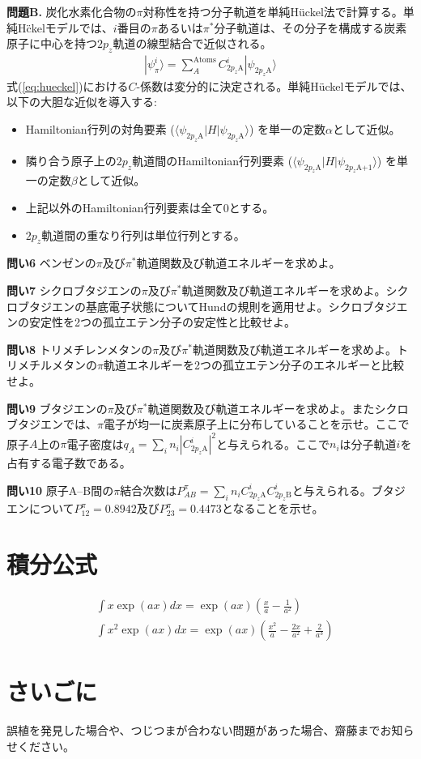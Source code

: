 \documentclass[11pt,pra,aps]{revtex4}
\begin{document}
\noindent
    {\bf 問題B.} 炭化水素化合物の$\pi$対称性を持つ分子軌道を単純H\"uckel法で計算する。単純H\"ckelモデルでは、$i$番目の$\pi$あるいは$\pi^*$分子軌道は、その分子を構成する炭素原子に中心を持つ$2p_z$軌道の線型結合で近似される。
\begin{align}
  |\psi_\pi^i\rangle=\sum_A^\text{Atoms}C^i_{2p_z\text{A}}|\psi_{2p_z\text{A}}\rangle \label{eq:hueckel}
\end{align}
式(\ref{eq:hueckel})における$C$-係数は変分的に決定される。単純H\"uckelモデルでは、以下の大胆な近似を導入する:
\begin{itemize}
\item Hamiltonian行列の対角要素 ($\langle\psi_{2p_z\text{A}}|H|\psi_{2p_z\text{A}}\rangle$) を単一の定数$\alpha$として近似。
\item 隣り合う原子上の$2p_z$軌道間のHamiltonian行列要素 ($\langle\psi_{2p_z\text{A}}|H|\psi_{2p_z\text{A+1}}\rangle$) を単一の定数$\beta$として近似。
\item 上記以外のHamiltonian行列要素は全て0とする。
\item $2p_z$軌道間の重なり行列は単位行列とする。
\end{itemize}

\noindent
{\bf 問い6} ベンゼンの$\pi$及び$\pi^*$軌道関数及び軌道エネルギーを求めよ。

\noindent
{\bf 問い7} シクロブタジエンの$\pi$及び$\pi^*$軌道関数及び軌道エネルギーを求めよ。シクロブタジエンの基底電子状態についてHundの規則を適用せよ。シクロブタジエンの安定性を2つの孤立エテン分子の安定性と比較せよ。

\noindent
{\bf 問い8} トリメチレンメタンの$\pi$及び$\pi^*$軌道関数及び軌道エネルギーを求めよ。トリメチルメタンの$\pi$軌道エネルギーを2つの孤立エテン分子のエネルギーと比較せよ。

\noindent
{\bf 問い9} ブタジエンの$\pi$及び$\pi^*$軌道関数及び軌道エネルギーを求めよ。またシクロブタジエンでは、$\pi$電子が均一に炭素原子上に分布していることを示せ。ここで原子$A$上の$\pi$電子密度は$q_A=\sum_i n_i |C^i_{2p_z\text{A}}|^2$と与えられる。ここで$n_i$は分子軌道$i$を占有する電子数である。

\noindent
{\bf 問い10} 原子A--B間の$\pi$結合次数は$P^\pi_{AB}=\sum_i n_i C^i_{2p_z\text{A}} C^i_{2p_z\text{B}}$と与えられる。ブタジエンについて$P^\pi_{12}=0.8942$及び$P^\pi_{23}=0.4473$となることを示せ。

\section{積分公式}
\begin{align}
  &\int x   \exp(ax) dx = \exp(ax)\left(\frac{x  }{a}-\frac{1}{a^2}\right) \\
  &\int x^2 \exp(ax) dx = \exp(ax)\left(\frac{x^2}{a}-\frac{2x}{a^2}+\frac{2}{a^3}\right) 
\end{align}

\section{さいごに}

誤植を発見した場合や、つじつまが合わない問題があった場合、齋藤までお知らせください。
\end{document}
